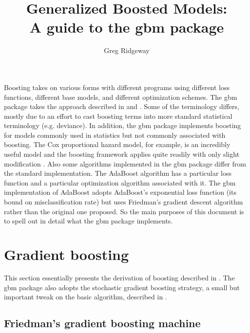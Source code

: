 \documentclass{article}
\title{Generalized Boosted Models:\\A guide to the gbm package} \author{Greg Ridgeway}
\begin{document}
\maketitle

Boosting takes on various forms with different programs using different loss functions, different base models, and different optimization schemes. The gbm package takes the approach described in \cite{Friedman:2001} and \cite{Friedman:2002}. Some of the terminology differs, mostly due to an effort to cast boosting terms into more standard statistical terminology (e.g. deviance). In addition, the gbm package implements boosting for models commonly used in statistics but not commonly associated with boosting. The Cox proportional hazard model, for example, is an incredibly useful model and the boosting framework applies quite readily with only slight modification \cite{Ridgeway:1999}. Also some algorithms implemented in the gbm package differ from the standard implementation. The AdaBoost algorithm \cite{FreundSchapire:1997} has a particular loss function and a particular optimization algorithm associated with it. The gbm implementation of AdaBoost adopts AdaBoost's exponential loss function (its bound on misclassification rate) but uses Friedman's gradient descent algorithm rather than the original one proposed. So the main purposes of this document is to spell out in detail what the gbm package implements.

\section{Gradient boosting}

This section essentially presents the derivation of boosting described in \cite{Friedman:2001}. The gbm package also adopts the stochastic gradient boosting strategy, a small but important tweak on the basic algorithm, described in \cite{Friedman:2002}.

\subsection{Friedman's gradient boosting machine} \label{sec:GradientBoostingMachine}
\end{document}
